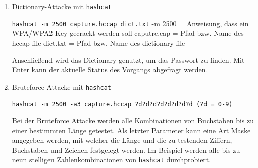 	\begin{enumerate}

	\item Dictionary-Attacke mit \colorbox{altgray}{\lstinline|hashcat|}

	\colorbox{altgray}{\lstinline|hashcat -m 2500 capture.hccap dict.txt|}\newline
	-m 2500 = Anweisung, dass ein WPA/WPA2 Key gecrackt werden soll\newline
	caputre.cap = Pfad bzw. Name des hccap file\newline
	dict.txt = Pfad bzw. Name des dictionary file

	Anschließend wird das Dictionary genutzt, um das Passwort zu finden. Mit Enter kann der aktuelle Status des Vorgangs abgefragt werden.
	\\
	\item Bruteforce-Attacke mit \colorbox{altgray}{\lstinline|hashcat|}

	\colorbox{altgray}{\lstinline|hashcat -m 2500 -a3 capture.hccap ?d?d?d?d?d?d?d?d (?d = 0-9)|}\newline

	Bei der Bruteforce Attacke werden alle Kombinationen von Buchstaben bis zu einer bestimmten Länge getestet. Als letzter Parameter kann eine Art Maske angegeben werden, mit welcher die Länge und die zu testenden Ziffern, Buchstaben und Zeichen festgelegt werden. Im Beispiel werden alle bis zu neun stelligen Zahlenkombinationen von \colorbox{altgray}{\lstinline|hashcat|} durchprobiert.\newline


\end{enumerate}
